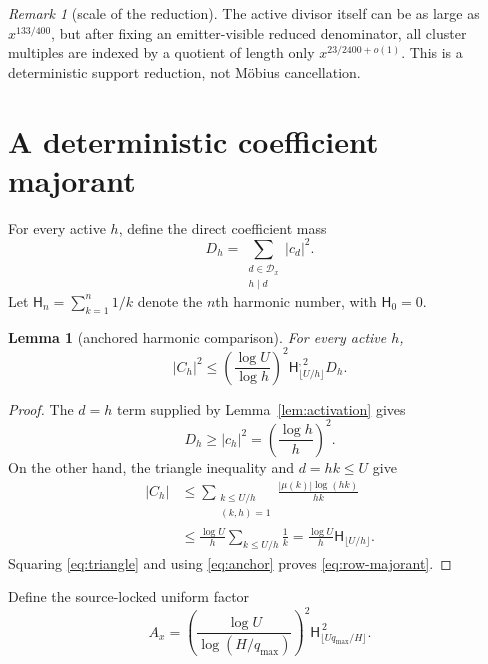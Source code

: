 \documentclass[11pt]{article}
\newtheorem{lemma}[theorem]{Lemma}
\theoremstyle{definition}
\theoremstyle{remark}
\newtheorem{remark}[theorem]{Remark}
\newcommand{\Dd}{\mathcal D}
\newcommand{\Harm}{\mathsf H}
\begin{document}
\begin{remark}[scale of the reduction]
The active divisor itself can be as large as $x^{133/400}$, but after fixing
an emitter-visible reduced denominator, all cluster multiples are indexed by
a quotient of length only $x^{23/2400+o(1)}$.  This is a deterministic support
reduction, not M\"obius cancellation.
\end{remark}

\section{A deterministic coefficient majorant}

For every active $h$, define the direct coefficient mass
\begin{equation}
 D_h=\sum_{\substack{d\in\Dd_x\\h\mid d}}|c_d|^2.
 \label{eq:direct-mass}
\end{equation}
Let $\Harm_n=\sum_{k=1}^n1/k$ denote the $n$th harmonic number, with
$\Harm_0=0$.

\begin{lemma}[anchored harmonic comparison]
\label{lem:harmonic}
For every active $h$,
\begin{equation}
 |C_h|^2\le
 \left(\frac{\log U}{\log h}\right)^2
 \Harm_{\lfloor U/h\rfloor}^{,2}D_h.
 \label{eq:row-majorant}
\end{equation}
\end{lemma}

\begin{proof}
The $d=h$ term supplied by Lemma~\ref{lem:activation} gives
\begin{equation}
 D_h\ge |c_h|^2=\left(\frac{\log h}{h}\right)^2.
 \label{eq:anchor}
\end{equation}
On the other hand, the triangle inequality and $d=hk\le U$ give
\begin{align}
 |C_h|
 &\le \sum_{\substack{k\le U/h\\(k,h)=1}}
       \frac{|\mu(k)|\log(hk)}{hk} \\
 &\le \frac{\log U}{h}
       \sum_{k\le U/h}\frac1k
 =\frac{\log U}{h}\Harm_{\lfloor U/h\rfloor}.
 \label{eq:triangle}
\end{align}
Squaring \eqref{eq:triangle} and using \eqref{eq:anchor} proves
\eqref{eq:row-majorant}.
\end{proof}

Define the source-locked uniform factor
\begin{equation}
 A_x=\left(\frac{\log U}{\log(H/q_{\max})}\right)^2
 \Harm_{\lfloor Uq_{\max}/H\rfloor}^{\,2}.
 \label{eq:Ax}
\end{equation}
\end{document}
